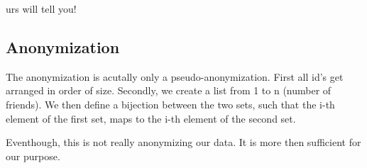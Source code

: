 urs will tell you! 

\subsection{Anonymization}

The anonymization is acutally only a pseudo-anonymization. First all id's get arranged in order of size. Secondly, we create a list from 1 to n (number of friends). We then define a bijection between the two sets, such that the i-th element of the first set, maps to the i-th element of the second set. 

Eventhough, this is not really anonymizing our data. It is more then sufficient for our purpose. 




